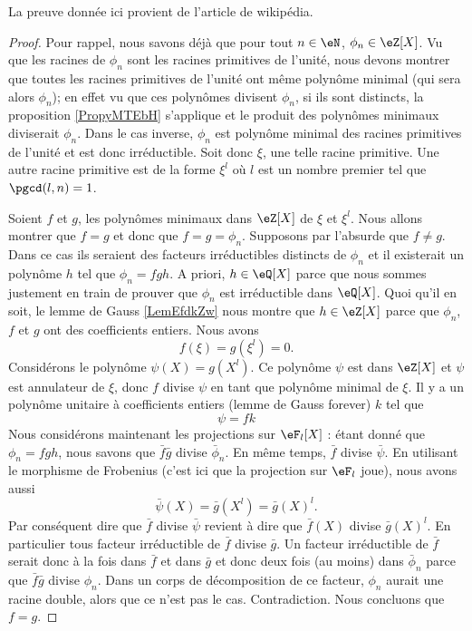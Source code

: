 La preuve donnée ici provient de l'article  de wikipédia.
\begin{proof}
    Pour rappel, nous savons déjà que pour tout \( n\in\eN\), \( \phi_n\in \eZ[X]\). Vu que les racines de \( \phi_n\) sont les racines primitives de l'unité, nous devons montrer que toutes les racines primitives de l'unité ont même polynôme minimal (qui sera alors \( \phi_n\)); en effet vu que ces polynômes divisent \( \phi_n\), si ils sont distincts, la proposition \ref{PropyMTEbH} s'applique et le produit des polynômes minimaux diviserait \( \phi_n\). Dans le cas inverse, \( \phi_n\) est polynôme minimal des racines primitives de l'unité et est donc irréductible. Soit donc \( \xi\), une telle racine primitive. Une autre racine primitive est de la forme \( \xi^l\) où \( l\) est un nombre premier tel que \( \pgcd(l,n)=1\).

    Soient \( f\) et \( g\), les polynômes minimaux dans \( \eZ[X]\) de \( \xi\) et \( \xi^l\). Nous allons montrer que \( f=g\) et donc que \( f=g=\phi_n\). Supposons par l'absurde que \( f\neq g\). Dans ce cas ils seraient des facteurs irréductibles distincts de \( \phi_n\) et il existerait un polynôme \( h\) tel que \( \phi_n=fgh\). A priori, \( h\in \eQ[X]\) parce que nous sommes justement en train de prouver que \( \phi_n\) est irréductible dans \( \eQ[X]\). Quoi qu'il en soit, le lemme de Gauss \ref{LemEfdkZw} nous montre que \( h\in \eZ[X]\) parce que \( \phi_n\), \( f\) et \( g\) ont des coefficients entiers. Nous avons
    \begin{equation}
        f(\xi)=g(\xi^l)=0.
    \end{equation}
    Considérons le polynôme \( \psi(X)=g(X^l)\). Ce polynôme \( \psi\) est dans \( \eZ[X]\) et \( \psi\) est annulateur de \( \xi\), donc \( f\) divise \( \psi\) en tant que polynôme minimal de \( \xi\). Il y a un polynôme unitaire à coefficients entiers (lemme de Gauss forever) \( k\) tel que
    \begin{equation}
        \psi=fk
    \end{equation}
    Nous considérons maintenant les projections sur \( \eF_l[X]\) : étant donné que \( \phi_n=fgh\), nous savons que \( \bar f\bar g\) divise \( \bar\phi_n\). En même temps, \( \bar f\) divise \( \bar \psi\). En utilisant le morphisme de Frobenius (c'est ici que la projection sur \( \eF_l\) joue), nous avons aussi
    \begin{equation}
        \bar\psi(X)=\bar g(X^l)=\bar g(X)^l.
    \end{equation}
    Par conséquent dire que \( \bar f\) divise \( \bar\psi\) revient à dire que \( \bar f(X)\) divise \( \bar g(X)^l\). En particulier tous facteur irréductible de \( \bar f\) divise \( \bar g\). Un facteur irréductible de \( \bar f\) serait donc à la fois dans \( \bar f\) et dans \( \bar g\) et donc deux fois (au moins) dans \( \bar\phi_n\) parce que \( \bar f\bar g\) divise \( \phi_n\). Dans un corps de décomposition de ce facteur, \( \phi_n\) aurait une racine double, alors que ce n'est pas le cas. Contradiction. Nous concluons que \( f=g\).
\end{proof}

